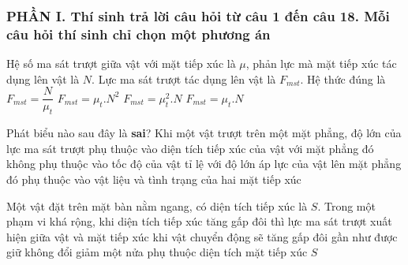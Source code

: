 \subsubsection*{PHẦN I. Thí sinh trả lời câu hỏi từ câu 1 đến câu 18. Mỗi câu hỏi thí sinh chỉ chọn một phương án}
\setcounter{ex}{0}
\begin{ex}%
Hệ số ma sát trượt giữa vật với mặt tiếp xúc là $\mu$, phản lực mà mặt tiếp xúc tác dụng lên vật là $N$. Lực ma sát trượt tác dụng lên vật là $F_{mst}$. Hệ thức đúng là
\choice
{$F_{mst}=\dfrac{N}{\mu_{t}}$}
{$F_{mst}=\mu_{t}.N^2$}
{$F_{mst}=\mu_{t}^2.N$}
{\True $F_{m s t}=\mu_{t}.N$}
 \end{ex}
\begin{ex}%
Phát biểu nào sau đây là \textbf{sai}? Khi một vật trượt trên một mặt phẳng, độ lớn của lực ma sát trượt
\choice
{\True phụ thuộc vào diện tích tiếp xúc của vật với mặt phẳng đó}
{không phụ thuộc vào tốc độ của vật}
{tỉ lệ với độ lớn áp lực của vật lên mặt phẳng đó}
{phụ thuộc vào vật liệu và tình trạng của hai mặt tiếp xúc}
\end{ex}
\begin{ex}%
Một vật đặt trên mặt bàn nằm ngang, có diện tích tiếp xúc là $S$. Trong một phạm vi khá rộng, khi diện tích tiếp xúc tăng gấp đôi thì lực ma sát trượt xuất hiện giữa vật và mặt tiếp xúc khi vật chuyển động sẽ
\choice
{tăng gấp đôi}
{\True gần như được giữ không đổi}
{giảm một nửa}
{phụ thuộc diện tích mặt tiếp xúc $S$}
 \end{ex}
